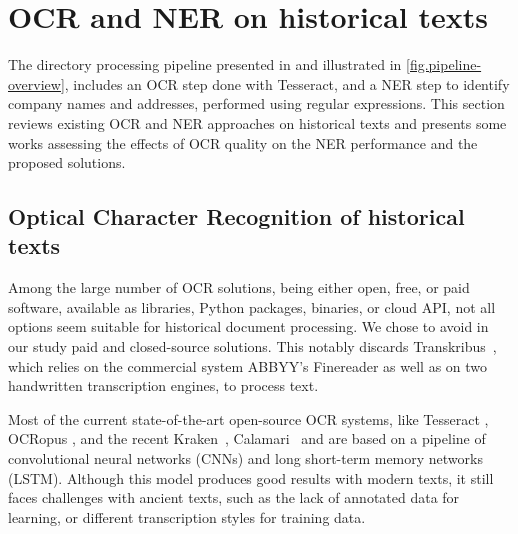 \section{OCR and NER on historical texts}
\label{sec:related-work}

The directory processing pipeline presented in \cite{bell2020automated} and illustrated in \cref{fig.pipeline-overview}, includes an OCR step done with Tesseract, and a NER step to identify company names and addresses, performed using regular expressions.
This section reviews existing OCR and NER approaches on historical texts and presents some works assessing the effects of OCR quality on the NER performance and the proposed solutions. 

\subsection{Optical Character Recognition of historical texts}
Among the large number of OCR solutions, being either open, free, or paid software, available as libraries, Python packages, binaries, or cloud API, not all options seem suitable for historical document processing.
We chose to avoid in our study paid and closed-source solutions.
This notably discards Transkribus~\cite{transkribus}, which relies on the commercial system ABBYY's Finereader as well as on two handwritten transcription engines, to process text.


Most of the current state-of-the-art open-source OCR systems, like Tesseract \cite{smith2007overview}, OCRopus \cite{breuel2008ocropus}, and the recent Kraken~\cite{kraken}, Calamari~\cite{wick_calamari_2020} and \peroocr \cite{kohut2021ts} are based on a pipeline of convolutional neural networks (CNNs) and long short-term memory networks (LSTM).
Although this model produces good results with modern texts, it still faces challenges with ancient texts, such as the lack of annotated data for learning, or different transcription styles for training data.
%

